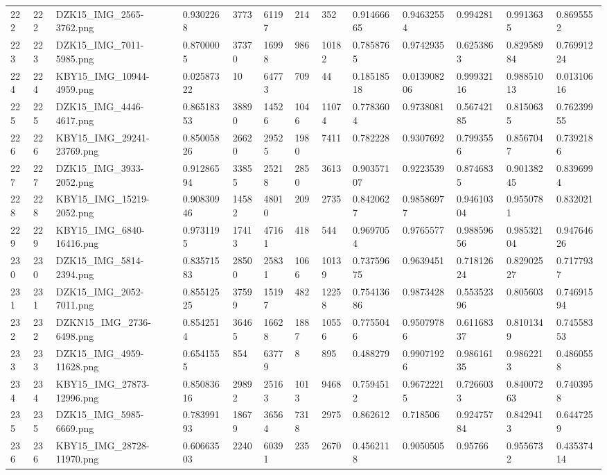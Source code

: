 \documentclass[11pt, a4paper, twoside]{report}
\begin{document}
\begin{longtable}[c]{@{}lllllllllllll@{}}
222 & 222 & DZK15\_IMG\_2565-3762.png & 0.9302268 & 3773 & 61197 & 214 & 352 & 0.91466665 & 0.94632554 & 0.994281 & 0.9913635 & 0.8695552 \\
223 & 223 & DZK15\_IMG\_7011-5985.png & 0.8700005 & 37370 & 16998 & 986 & 10182 & 0.7858765 & 0.9742935 & 0.6253863 & 0.82958984 & 0.76991224 \\
224 & 224 & KBY15\_IMG\_10944-4959.png & 0.02587322 & 10 & 64773 & 709 & 44 & 0.18518518 & 0.013908206 & 0.99932116 & 0.98851013 & 0.01310616 \\
225 & 225 & DZK15\_IMG\_4446-4617.png & 0.86518353 & 38890 & 14526 & 1046 & 11074 & 0.7783604 & 0.9738081 & 0.56742185 & 0.8150635 & 0.76239955 \\
226 & 226 & KBY15\_IMG\_29241-23769.png & 0.85005826 & 26620 & 29525 & 1980 & 7411 & 0.782228 & 0.9307692 & 0.7993556 & 0.8567047 & 0.7392186 \\
227 & 227 & DZK15\_IMG\_3933-2052.png & 0.91286594 & 33855 & 25218 & 2850 & 3613 & 0.90357107 & 0.9223539 & 0.8746835 & 0.90138245 & 0.8396994 \\
228 & 228 & KBY15\_IMG\_15219-2052.png & 0.90830946 & 14582 & 48010 & 209 & 2735 & 0.8420627 & 0.98586977 & 0.94610304 & 0.9550781 & 0.832021 \\
229 & 229 & KBY15\_IMG\_6840-16416.png & 0.9731195 & 17413 & 47161 & 418 & 544 & 0.9697054 & 0.9765577 & 0.98859656 & 0.98532104 & 0.94764626 \\
230 & 230 & DZK15\_IMG\_5814-2394.png & 0.83571583 & 28500 & 25831 & 1066 & 10139 & 0.73759675 & 0.9639451 & 0.71812624 & 0.82902527 & 0.7177937 \\
231 & 231 & DZK15\_IMG\_2052-7011.png & 0.85512525 & 37599 & 15197 & 482 & 12258 & 0.75413686 & 0.9873428 & 0.55352396 & 0.805603 & 0.74691594 \\
232 & 232 & DZKN15\_IMG\_2736-6498.png & 0.8542514 & 36465 & 16628 & 1887 & 10556 & 0.7755046 & 0.95079786 & 0.61168337 & 0.8101349 & 0.74558353 \\
233 & 233 & DZK15\_IMG\_4959-11628.png & 0.6541555 & 854 & 63779 & 8 & 895 & 0.488279 & 0.99071926 & 0.98616135 & 0.9862213 & 0.4860558 \\
234 & 234 & KBY15\_IMG\_27873-12996.png & 0.85083616 & 29892 & 25163 & 1013 & 9468 & 0.7594512 & 0.96722215 & 0.7266033 & 0.84007263 & 0.7403958 \\
235 & 235 & DZK15\_IMG\_5985-6669.png & 0.78399193 & 18679 & 36564 & 7318 & 2975 & 0.862612 & 0.718506 & 0.92475784 & 0.8429413 & 0.6447259 \\
236 & 236 & KBY15\_IMG\_28728-11970.png & 0.60663503 & 2240 & 60391 & 235 & 2670 & 0.4562118 & 0.9050505 & 0.95766 & 0.9556732 & 0.43537414 \\

\end{longtable}
\end{document}
